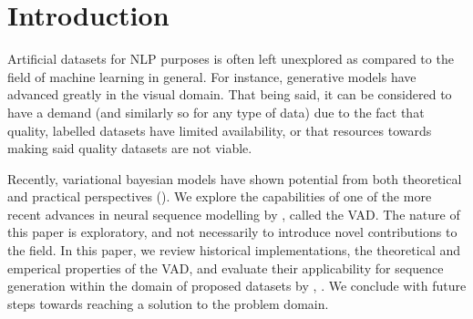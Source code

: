 \documentclass[12pt,twoside]{report}
\begin{document}
\begin{abstract}
\end{abstract}



\tableofcontents 


\setcounter{page}{1}
\fancyhead[LE,RO]{\slshape \rightmark}
\fancyhead[LO,RE]{\slshape \leftmark}



\chapter{Introduction}


Artificial datasets for NLP purposes is often left unexplored as compared to the field of machine learning in general. For instance, generative models have advanced greatly in the visual domain. %
That being said, it can be considered to have a demand (and similarly so for any type of data) due to the fact that quality, labelled datasets have limited availability, or that resources towards making said quality datasets are not viable.

Recently, variational bayesian models have shown potential from both theoretical and practical perspectives (\cite{kingma_auto-encoding_2013}). We explore the capabilities of one of the more recent advances in neural sequence modelling by \cite{du_variational_2018}, called the VAD. 
The nature of this paper is exploratory, and not necessarily to introduce novel contributions to the field. In this paper, we review historical implementations, the theoretical and emperical properties of the VAD, and evaluate their applicability for sequence generation within the domain of proposed datasets by \cite{he_ups_2016}, \cite{lison_opensubtitles2016:_2016}. We conclude with future steps towards reaching a solution to the problem domain.
\end{document}
